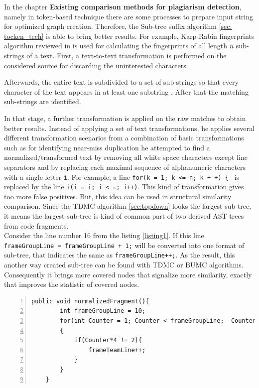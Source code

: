 \documentclass{report}
\begin{document}
In the chapter \textbf{Existing comparison methods for plagiarism detection}, namely in token-based technique there are some processes to prepare input string for optimized graph creation. Therefore, the Sub-tree suffix algorithm \ref{sec: tocken_tech} is able to bring better results.
For example, Karp-Rabin fingerprints algorithm reviewed in \cite{software_clone_detection} is used for calculating the fingerprints of all
length $n$ sub-strings of a text. First, a text-to-text transformation is performed on the considered source for discarding the uninterested characters.

Afterwards, the entire text
is subdivided to a set of sub-strings so that every character of the text appears in at least
one substring \cite{software_clone_detection}. After that the matching sub-strings are identified. 

In that stage, a further transformation is applied on the raw matches to obtain better results. Instead of applying
a set of text transformations, he applies several different transformation scenarios
from a combination of basic transformations such as for identifying near-miss duplication he
attempted to find a normalized/transformed text by removing all white space characters
except line separators and by replacing each maximal sequence of alphanumeric characters
with a single letter \texttt{i}. For example, a line \texttt{for(k = 1; k <= n; k + +) \{ } is replaced by
the line \texttt{i(i = i; i < =; i++)}. This kind of transformation gives too more false positives. But, this idea can be used in structural similarity comparison. Since the TDMC algorithm \ref{sec:topdown} looks the largest sub-tree, it means the largest sub-tree is kind of common part of two derived AST trees from code fragments. \\
Consider the line number 16 from the listing \ref{listing1}. If this line \texttt{frameGroupLine = frameGroupLine + 1;} will be converted into one format of sub-tree, that indicates the same as \texttt{frameGroupLine++;}. As the result, this another way created sub-tree can be found with TDMC or BUMC algorithms. Consequently it brings more covered nodes that signalize more similarity, exactly that improves the statistic of covered nodes.

\begin{lstlisting}[caption= {Normalized function \texttt{normalizedFragment()} concerning variable \texttt {frameGroupLine}}, label = listing2, numbers=left, numbersep=-5pt]
	public void normalizedFragment(){
		int frameGroupLine = 10;
		for(int Counter = 1; Counter < frameGroupLine;  Counter =+ 2)
		{
			if(Counter*4 != 2){ 
				frameTeamLine++;
			}
		}
	}
\end{lstlisting}
\end{document}
